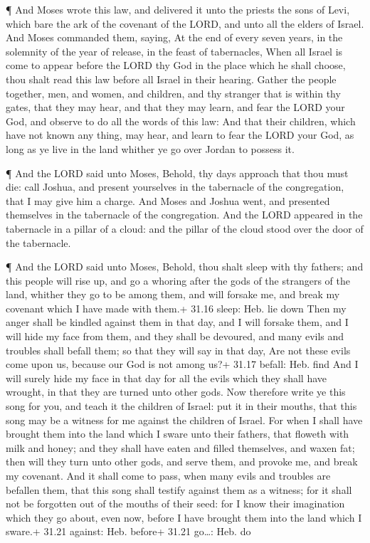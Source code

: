  ¶ And Moses wrote this law, and delivered it unto the
priests the sons of Levi, which bare the ark of the covenant of the
LORD, and unto all the elders of Israel.  And Moses
commanded them, saying, At the end of every seven years, in the
solemnity of the year of release, in the feast of tabernacles,
 When all Israel is come to appear before the LORD thy God
in the place which he shall choose, thou shalt read this law before all
Israel in their hearing.  Gather the people together, men,
and women, and children, and thy stranger that is within thy gates, that
they may hear, and that they may learn, and fear the LORD your God, and
observe to do all the words of this law:  And that their
children, which have not known any thing, may hear, and learn to fear
the LORD your God, as long as ye live in the land whither ye go over
Jordan to possess it.

 ¶ And the LORD said unto Moses, Behold, thy days approach
that thou must die: call Joshua, and present yourselves in the
tabernacle of the congregation, that I may give him a charge. And Moses
and Joshua went, and presented themselves in the tabernacle of the
congregation.  And the LORD appeared in the tabernacle in a
pillar of a cloud: and the pillar of the cloud stood over the door of
the tabernacle.

 ¶ And the LORD said unto Moses, Behold, thou shalt sleep
with thy fathers; and this people will rise up, and go a whoring after
the gods of the strangers of the land, whither they go to be among them,
and will forsake me, and break my covenant which I have made with them.+
31.16 sleep: Heb. lie down  Then my anger shall be kindled
against them in that day, and I will forsake them, and I will hide my
face from them, and they shall be devoured, and many evils and troubles
shall befall them; so that they will say in that day, Are not these
evils come upon us, because our God is not among us?+ 31.17 befall: Heb.
find  And I will surely hide my face in that day for all
the evils which they shall have wrought, in that they are turned unto
other gods.  Now therefore write ye this song for you, and
teach it the children of Israel: put it in their mouths, that this song
may be a witness for me against the children of Israel. 
For when I shall have brought them into the land which I sware unto
their fathers, that floweth with milk and honey; and they shall have
eaten and filled themselves, and waxen fat; then will they turn unto
other gods, and serve them, and provoke me, and break my covenant.
 And it shall come to pass, when many evils and troubles
are befallen them, that this song shall testify against them as a
witness; for it shall not be forgotten out of the mouths of their seed:
for I know their imagination which they go about, even now, before I
have brought them into the land which I sware.+ 31.21 against: Heb.
before+ 31.21 go\ldots: Heb. do

